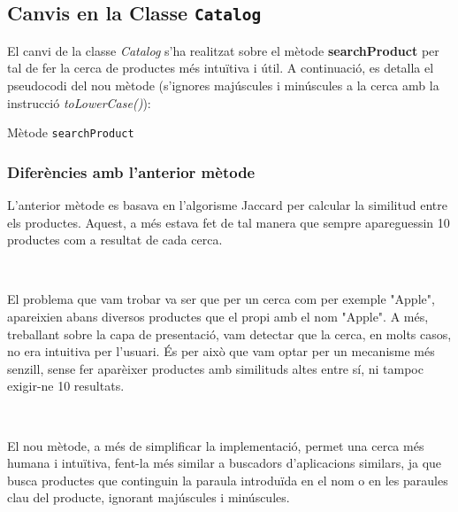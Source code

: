 \documentclass[a4paper,12pt]{report}
\begin{document}
\subsection{Canvis en la Classe \texttt{Catalog}}

El canvi de la classe \textit{Catalog} s'ha realitzat sobre el mètode \textbf{searchProduct} per tal de fer la cerca de productes més intuïtiva i útil. A continuació, es detalla el pseudocodi del nou mètode (s'ignores majúscules i minúscules a la cerca amb la instrucció \textit{toLowerCase()}):

\begin{algorithm}[H]
\SetAlgoLined
{}
\caption{Mètode \texttt{searchProduct}}
\end{algorithm}

\subsubsection{Diferències amb l'anterior mètode}

L'anterior mètode es basava en l'algorisme Jaccard per calcular la similitud entre els productes. Aquest, a més estava fet de tal manera que sempre apareguessin 10 productes com a resultat de cada cerca. 

\

El problema que vam trobar va ser que per un cerca com per exemple "Apple", apareixien abans diversos productes que el propi amb el nom "Apple". A més, treballant sobre la capa de presentació, vam detectar que la cerca, en molts casos, no era intuitiva per l'usuari. És per això que vam optar per un mecanisme més senzill, sense fer aparèixer productes amb similituds altes entre sí, ni tampoc exigir-ne 10 resultats.

\

El nou mètode, a més de simplificar la implementació, permet una cerca més humana i intuïtiva, fent-la més similar a buscadors d'aplicacions similars, ja que busca productes que continguin la paraula introduïda en el nom o en les paraules clau del producte, ignorant majúscules i minúscules. 
\end{document}
